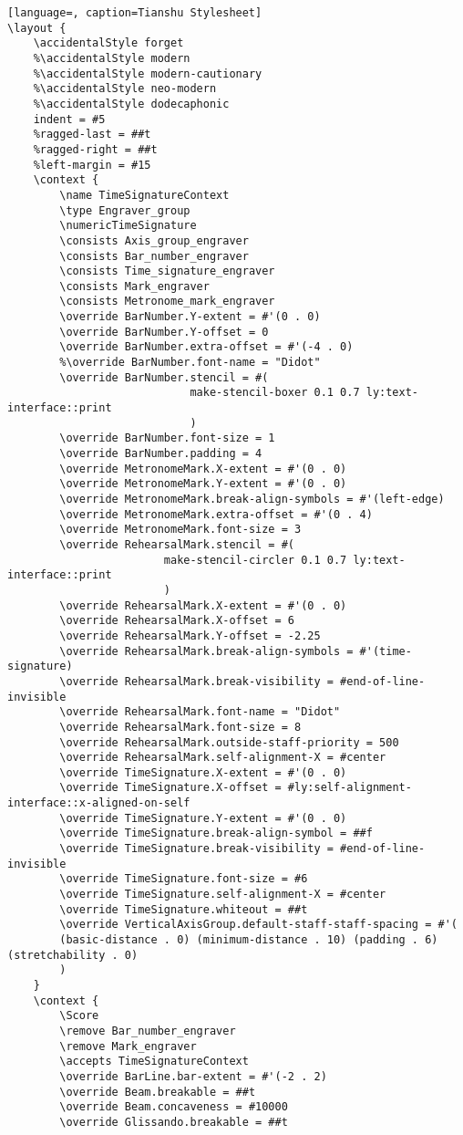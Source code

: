 \begin{lstlisting}[language=, caption=Tianshu Stylesheet]
\layout {
    \accidentalStyle forget
	%\accidentalStyle modern
	%\accidentalStyle modern-cautionary
	%\accidentalStyle neo-modern
	%\accidentalStyle dodecaphonic
    indent = #5
	%ragged-last = ##t
    %ragged-right = ##t
    %left-margin = #15
	\context {
        \name TimeSignatureContext
        \type Engraver_group
        \numericTimeSignature
        \consists Axis_group_engraver
		\consists Bar_number_engraver
        \consists Time_signature_engraver
		\consists Mark_engraver
		\consists Metronome_mark_engraver
		\override BarNumber.Y-extent = #'(0 . 0)
		\override BarNumber.Y-offset = 0
		\override BarNumber.extra-offset = #'(-4 . 0)
		%\override BarNumber.font-name = "Didot"
		\override BarNumber.stencil = #(
							make-stencil-boxer 0.1 0.7 ly:text-interface::print
							)
		\override BarNumber.font-size = 1
		\override BarNumber.padding = 4
		\override MetronomeMark.X-extent = #'(0 . 0)
		\override MetronomeMark.Y-extent = #'(0 . 0)
		\override MetronomeMark.break-align-symbols = #'(left-edge)
		\override MetronomeMark.extra-offset = #'(0 . 4)
		\override MetronomeMark.font-size = 3
		\override RehearsalMark.stencil = #(
						make-stencil-circler 0.1 0.7 ly:text-interface::print
						)
		\override RehearsalMark.X-extent = #'(0 . 0)
		\override RehearsalMark.X-offset = 6
		\override RehearsalMark.Y-offset = -2.25
		\override RehearsalMark.break-align-symbols = #'(time-signature)
		\override RehearsalMark.break-visibility = #end-of-line-invisible
		\override RehearsalMark.font-name = "Didot"
		\override RehearsalMark.font-size = 8
		\override RehearsalMark.outside-staff-priority = 500
		\override RehearsalMark.self-alignment-X = #center
        \override TimeSignature.X-extent = #'(0 . 0)
        \override TimeSignature.X-offset = #ly:self-alignment-interface::x-aligned-on-self
        \override TimeSignature.Y-extent = #'(0 . 0)
        \override TimeSignature.break-align-symbol = ##f
        \override TimeSignature.break-visibility = #end-of-line-invisible
        \override TimeSignature.font-size = #6
        \override TimeSignature.self-alignment-X = #center
		\override TimeSignature.whiteout = ##t
        \override VerticalAxisGroup.default-staff-staff-spacing = #'(
		(basic-distance . 0) (minimum-distance . 10) (padding . 6) (stretchability . 0)
		)
    }
    \context {
        \Score
        \remove Bar_number_engraver
		\remove Mark_engraver
        \accepts TimeSignatureContext
		\override BarLine.bar-extent = #'(-2 . 2)
        \override Beam.breakable = ##t
		\override Beam.concaveness = #10000
		\override Glissando.breakable = ##t

\end{lstlisting}
